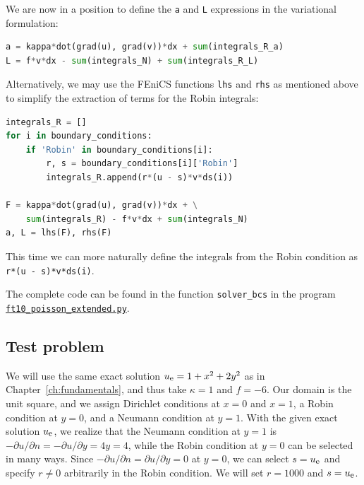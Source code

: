 \documentclass[graybox,envcountchap,sectrefs,final]{svmonodo}
\begin{document}
We are now in a position to define the \texttt{a} and \texttt{L} expressions
in the variational formulation:

\begin{lstlisting}[language=Python,style=graycolor]
a = kappa*dot(grad(u), grad(v))*dx + sum(integrals_R_a)
L = f*v*dx - sum(integrals_N) + sum(integrals_R_L)
\end{lstlisting}


Alternatively, we may use the FEniCS functions \texttt{lhs} and \texttt{rhs} as
mentioned above to simplify the extraction of terms for the Robin
integrals:

\begin{lstlisting}[language=Python,style=graycolor]
integrals_R = []
for i in boundary_conditions:
    if 'Robin' in boundary_conditions[i]:
        r, s = boundary_conditions[i]['Robin']
        integrals_R.append(r*(u - s)*v*ds(i))

F = kappa*dot(grad(u), grad(v))*dx + \
    sum(integrals_R) - f*v*dx + sum(integrals_N)
a, L = lhs(F), rhs(F)
\end{lstlisting}
This time we can more naturally define the integrals from the
Robin condition as \texttt{r*(u - s)*v*ds(i)}.

The complete code can be found in the function
\Verb!solver_bcs! in the program
\href{{https://fenicsproject.org/pub/tutorial/python/vol1/ft10_poisson_extended.py}}{\nolinkurl{ft10_poisson_extended.py}}.


\subsection{Test problem}

We will use the same exact solution $\uex=1+x^2+2y^2$ as in Chapter~\ref{ch:fundamentals}, and thus take $\kappa=1$ and $f=-6$. Our domain
is the unit square, and we assign Dirichlet conditions at $x=0$ and
$x=1$, a Robin condition at $y=0$, and a Neumann condition at
$y=1$. With the given exact solution $\uex$, we realize that the
Neumann condition at $y=1$ is $-\partial u / \partial n = - \partial u /
\partial y = 4y = 4$, while the Robin condition at $y=0$ can be selected in
many ways. Since $-\partial u/\partial n=\partial u/\partial y=0$ at
$y=0$, we can select $s=\uex$ and specify $r \neq 0$ arbitrarily in the
Robin condition. We will set $r = 1000$ and $s = \uex$.
\end{document}
